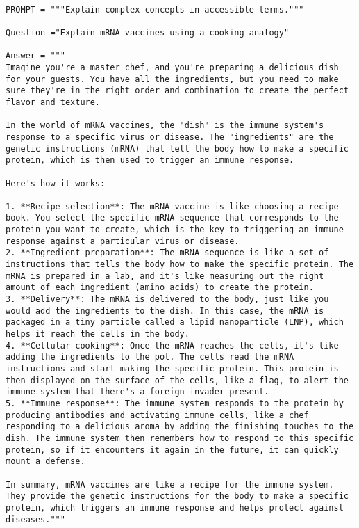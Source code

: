 \begin{tcolorbox}[title={\textbf{\small Performance Before Optimization}}, boxrule=2pt, arc=0mm, breakable]
\begin{verbatim}

PROMPT = """Explain complex concepts in accessible terms."""

Question ="Explain mRNA vaccines using a cooking analogy"

Answer = """
Imagine you're a master chef, and you're preparing a delicious dish for your guests. You have all the ingredients, but you need to make sure they're in the right order and combination to create the perfect flavor and texture.

In the world of mRNA vaccines, the "dish" is the immune system's response to a specific virus or disease. The "ingredients" are the genetic instructions (mRNA) that tell the body how to make a specific protein, which is then used to trigger an immune response.

Here's how it works:

1. **Recipe selection**: The mRNA vaccine is like choosing a recipe book. You select the specific mRNA sequence that corresponds to the protein you want to create, which is the key to triggering an immune response against a particular virus or disease.
2. **Ingredient preparation**: The mRNA sequence is like a set of instructions that tells the body how to make the specific protein. The mRNA is prepared in a lab, and it's like measuring out the right amount of each ingredient (amino acids) to create the protein.
3. **Delivery**: The mRNA is delivered to the body, just like you would add the ingredients to the dish. In this case, the mRNA is packaged in a tiny particle called a lipid nanoparticle (LNP), which helps it reach the cells in the body.
4. **Cellular cooking**: Once the mRNA reaches the cells, it's like adding the ingredients to the pot. The cells read the mRNA instructions and start making the specific protein. This protein is then displayed on the surface of the cells, like a flag, to alert the immune system that there's a foreign invader present.
5. **Immune response**: The immune system responds to the protein by producing antibodies and activating immune cells, like a chef responding to a delicious aroma by adding the finishing touches to the dish. The immune system then remembers how to respond to this specific protein, so if it encounters it again in the future, it can quickly mount a defense.

In summary, mRNA vaccines are like a recipe for the immune system. They provide the genetic instructions for the body to make a specific protein, which triggers an immune response and helps protect against diseases."""

\end{verbatim}
\end{tcolorbox}

